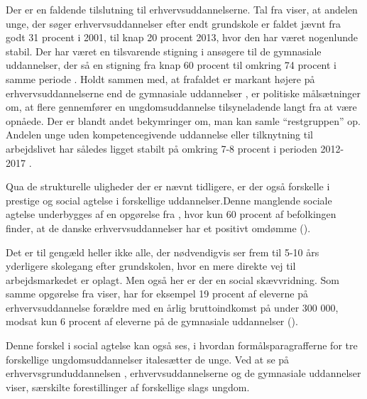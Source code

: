 Der er en faldende tilslutning til erhvervsuddannelserne.
Tal fra \citeauthor{borne-ogundervisningsministerietSogning} viser, at andelen unge, der søger erhvervsuddannelser efter endt grundskole er faldet jævnt fra godt 31 procent i 2001, til knap 20 procent 2013, hvor den har været nogenlunde stabil.
Der har været en tilsvarende stigning i ansøgere til de gymnasiale uddannelser, der så en stigning fra knap 60 procent til omkring 74 procent i samme periode \autocite[s 5f]{undervisningsministerietOg10Klasseelevernes2017}.
Holdt sammen med, at frafaldet er markant højere på erhvervsuddannelserne end de gymnasiale uddannelser \autocite{danskegymnasierFuldforelseOgKarakterer2019}, er politiske målsætninger om, at flere gennemfører en ungdomsuddannelse tilsyneladende langt fra at være opnåede.
Der er blandt andet bekymringer om, man kan samle “restgruppen” op.
Andelen unge uden kompetencegivende uddannelse eller tilknytning til arbejdslivet har således ligget stabilt på omkring 7-8 procent i perioden 2012-2017 \autocite[s. 9]{andersenUngeUdenUddannelse2019}.

Qua de strukturelle uligheder der er nævnt tidligere, er der også forskelle i prestige og social agtelse i forskellige uddannelser.Denne manglende sociale agtelse underbygges af en opgørelse fra \citeauthor{danmarksstatistikErhvervsuddannelserDanmark20192019}, hvor kun 60 procent af befolkingen finder, at de danske erhvervsuddannelser har et positivt omdømme (\citeyear[s. 7]{danmarksstatistikErhvervsuddannelserDanmark20192019}).

Det er til gengæld heller ikke alle, der nødvendigvis ser frem til 5-10 års yderligere skolegang efter grundskolen, hvor en mere direkte vej til arbejdsmarkedet er oplagt.
Men også her er der en social skævvridning.
Som samme opgørelse fra \citeauthor{danmarksstatistikErhvervsuddannelserDanmark20192019} viser, har for eksempel 19 procent af eleverne på erhvervsuddannelse forældre med en årlig bruttoindkomst på under 300 000, modsat kun 6 procent af eleverne på de gymnasiale uddannelser (\citeyear[s. 6]{danmarksstatistikErhvervsuddannelserDanmark20192019}). 

Denne forskel i social agtelse kan også ses, i hvordan formålsparagrafferne for tre forskellige ungdomsuddannelser italesætter de unge. Ved at se på erhvervsgrunduddannelsen \autocite[§ 1]{uddannelsesministerietBekendtgorelseAfLov2016a}, erhvervsuddannelserne \autocite[§1, stk.2]{uddannelsesministerietBekendtgorelseAfLov2020} og de gymnasiale uddannelser \autocite[§1]{uddannelsesministerietBekendtgorelseAfLov2019} viser, særskilte forestillinger af forskellige slags ungdom.

